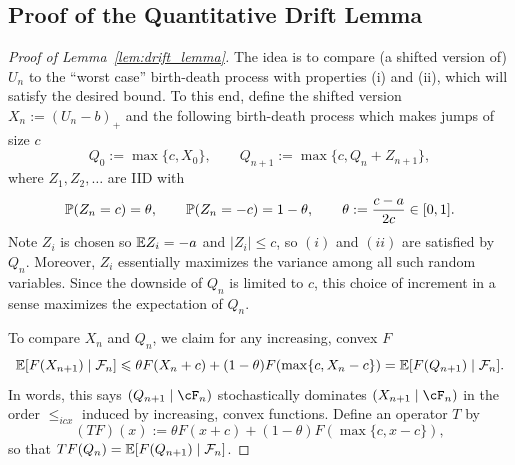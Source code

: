 \begin{subappendices}
\newpage
\subsection{Proof of the Quantitative Drift Lemma}
\label{appendix:convergence_rate_proofs}


\begin{proof}[Proof of Lemma~\ref{lem:drift_lemma}]
    The idea is to compare (a shifted version of) $U_n$ to the ``worst case'' birth-death process with properties (i) and (ii), which will satisfy the desired bound. To this end, define the shifted version $X_n := (U_n - b)_+$ and the following birth-death process which makes jumps of size $c$
        $$Q_0 := \max \{ c,X_0\}, \qquad Q_{n+1} := \max \{ c, Q_n + Z_{n+1}\},$$
    where $Z_1,Z_2,\dots$ are IID with
        $$\P(Z_n = c) = \theta, \qquad \P(Z_n = -c) = 1-\theta, \qquad \theta := \frac{c-a}{2c} \in [0,1].$$
    \noindent Note $Z_i$ is chosen so $\E Z_i = -a$ and $|Z_i| \leq c$, so $(i)$ and $(ii)$ are satisfied by $Q_n$. Moreover, $Z_i$ essentially maximizes the variance among all such random variables. Since the downside of $Q_n$ is limited to $c$, this choice of increment in a sense maximizes the expectation of $Q_n$.


    To compare $X_n$ and $Q_n$, we claim for any increasing, convex $F$
    \begin{equation}
        \E[F(X_{n+1}) \mid \mathcal F_n] \leq \theta F(X_n + c) + (1-\theta)  F(\max \{c, X_n - c \}) = \E[F(Q_{n+1}) \mid \mathcal F_n].
        \label{claim:operator_T_increasing_convex_order}
    \end{equation}
    \noindent In words, this says $(Q_{n+1} \mid \cF_n)$ stochastically dominates $(X_{n+1} \mid \cF_n)$ in the order $\leq_{icx}$ induced by increasing, convex functions. Define an operator $T$ by
        \[(TF)(x) := \theta F(x + c) + (1-\theta)F(\max \{ c,x-c\}),\]
    \noindent so that $TF(Q_n) = \E[F(Q_{n+1}) \mid \mathcal F_n]$.


\end{proof}
\end{subappendices}
